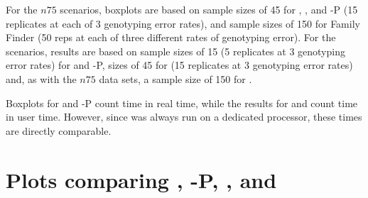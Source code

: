 \documentclass[11pt,landscape]{report}
\begin{document}
For the $n75$ scenarios, boxplots are based on sample sizes of 45 for \prt{}, \colony{}, and \colony{}-P (15 replicates at each of 3 genotyping error rates),  and sample sizes of 150 for Family Finder (50 reps at each of three different rates of genotyping error).  For the \lottalarge{} scenarios, results are based on sample sizes of 15 (5 replicates at 3 genotyping error rates) for \colony{} and \colony-P{}, sizes of 45 for \prt{} (15 replicates at 3 genotyping error rates) and, as with the $n75$ data sets, a sample size of 150 for \familyfinder{}. 

 
Boxplots for \colony{} and \colony{}-P count time in real time, while the results for \prt{} and \familyfinder{} count time in user time.  However, since \colony was always run on a dedicated processor, these times are directly comparable.
\newpage

\tableofcontents

\listoffigures

\part{Plots comparing \colony{}, \colony{}-P, \familyfinder{}, and \prt}


\end{document}
